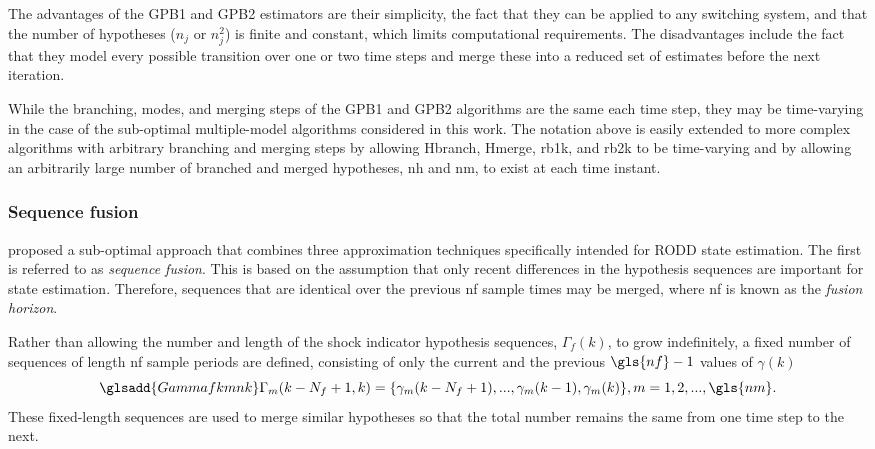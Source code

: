 The advantages of the \gls{GPB1} and \gls{GPB2} estimators are their simplicity, the fact that they can be applied to any switching system, and that the number of hypotheses ($n_j$ or $n_j^2$) is finite and constant, which limits computational requirements. The disadvantages include the fact that they model every possible transition over one or two time steps and merge these into a reduced set of estimates before the next iteration. 

While the branching, modes, and merging steps of the \gls{GPB1} and \gls{GPB2} algorithms are the same each time step, they may be time-varying in the case of the sub-optimal multiple-model algorithms considered in this work. The notation above is easily extended to more complex algorithms with arbitrary branching and merging steps by allowing \gls{Hbranch}, \gls{Hmerge}, \gls{rb1k}, and \gls{rb2k} to be time-varying and by allowing an arbitrarily large number of branched and merged hypotheses, \gls{nh} and \gls{nm}, to exist at each time instant.

\subsubsection{Sequence fusion} \label{sec:fusion}

\cite{robertson_detection_1995} proposed a sub-optimal approach that combines three approximation techniques specifically intended for \gls{RODD} state estimation. The first is referred to as \textit{sequence fusion}. This is based on the assumption that only recent differences in the hypothesis sequences are important for state estimation. Therefore, sequences that are identical over the previous \gls{nf} sample times may be merged, where \gls{nf} is known as the \textit{fusion horizon}.

Rather than allowing the number and length of the shock indicator hypothesis sequences, $\Gamma_f(k)$, to grow indefinitely, a fixed number of sequences of length \gls{nf} sample periods are defined, consisting of only the current and the previous $\gls{nf}-1$ values of $\gamma(k)$
\begin{equation} \label{eq:Gamma_kmf_k}
	\glsadd{Gammafkmnk}\Gamma_m(k-N_f+1,k)=\{\gamma_m(k-N_f+1), ...,  \gamma_m(k-1), \gamma_m(k)\}, m=1,2,..., \gls{nm}.
\end{equation}
These fixed-length sequences are used to merge similar hypotheses so that the total number remains the same from one time step to the next.

